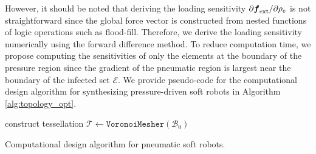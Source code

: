 \noindent However, it should be noted that deriving the loading sensitivity $\partial \boldsymbol{f}_{\textrm{ext}}/\partial \rho_e$ is not straightforward since the global force vector is constructed from nested functions of logic operations such as flood-fill. Therefore, we derive the loading sensitivity numerically using the forward difference method. To reduce computation time, we propose computing the sensitivities of only the elements at the boundary of the pressure region since the gradient of the pneumatic region is largest near the boundary of the infected set $\mathcal{E}$. We provide pseudo-code for the computational design algorithm for synthesizing pressure-driven soft robots in Algorithm \ref{alg:topology_opt}. 

\begin{algorithm}[!t]
  construct tessellation $\mathcal{T} \gets {\texttt{VoronoiMesher}}(\mathcal{B}_0)$\;
  \caption{Computational design algorithm for pneumatic soft robots.\label{alg:topology_opt}}
\end{algorithm}
\clearpage


